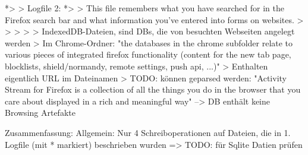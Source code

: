 		*> %
		> %
	Logfile 2:
		*> %
		> %
			This file remembers what you have searched for in the Firefox search bar and what information you’ve entered into forms on websites.
		> %
		> %
		> %
		> %
			> IndexedDB-Dateien, sind DBs, die von besuchten Webseiten
			angelegt werden %
			> Im Chrome-Ordner: "the databases in the chrome subfolder relate to various pieces of integrated firefox functionality (content for the new tab page, blocklists, shield/normandy, remote settings, push api, ...)"
			> Enthalten eigentlich URL im Dateinamen
			> TODO: können geparsed werden: %
			"Activity Stream for Firefox is a collection of all the things you do in the browser that you care about displayed in a rich and meaningful way" 
			--> DB enthält keine Browsing Artefakte

Zusammenfassung:
	Allgemein: Nur 4 Schreiboperationen auf Dateien, die in 1. Logfile (mit * markiert) beschrieben wurden => TODO: für Sqlite Datien prüfen

